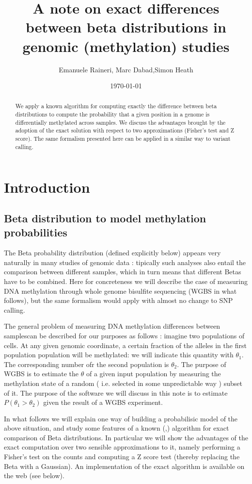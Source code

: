 \documentclass[11pt]{amsart}
\title{A note on exact differences between beta distributions in genomic (methylation) studies}
\author{Emanuele Raineri, Marc Dabad,Simon Heath}
\date{\today}
\begin{document}
\begin{abstract}
We apply a known algorithm for computing exactly the difference between beta distributions
to compute the probability that a given position in a genome is differentially methylated across
samples. We discuss the advantages brought by the adoption of the exact solution
with respect to two approximations (Fisher's test and Z score).
The same formalism presented here can be applied in a similar way to variant calling.
\end{abstract}
\maketitle
\section{Introduction}
\subsection{Beta distribution to model methylation probabilities}
The Beta probability distribution (defined explicitly below)  appears very naturally in many studies of genomic data : tipically such analyses also entail the comparison between different samples, which in turn means that different Betas have to be combined. Here for concreteness we will describe the case of measuring DNA methylation through whole genome bisulfite sequencing (WGBS in what follows), but the same formalism would apply with almost no change to SNP calling. 

The general problem  of measuring DNA methylation differences between samplescan be described for our purposes as follows : imagine two populations of cells. At any given genomic coordinate, a certain fraction of the alleles in the first population population will be methylated: we will indicate this quantity with $\theta_1$. The corresponding number ofr the second population is $\theta_2$. The purpose of WGBS is to estimate the $\theta$ of a given input population by measuring the methylation state of a random ( i.e. selected in some unpredictable way )  subset of it. The purpose of the software we will discuss in this note is to estimate $P(\theta_1>\theta_2)$ given the result of a WGBS experiment.

In what follows we will explain one way of building a probabilisic model of the above situation, and study some features of a known (\cite{exactbetaineq},\cite{numineq}) algorithm for exact comparison of Beta distributions. In particular we will show the advantages of the exact computation over two sensible approximations to it, namely performing a Fisher's test on the counts and computing a Z score test (thereby replacing the Beta with a Gaussian). An implementation of the exact algorithm is available on the web (see below).
\end{document}
